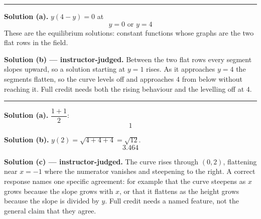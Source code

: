 \documentclass[12pt]{article}
\begin{document}
\vspace{0.15cm}\noindent\rule{\linewidth}{0.2pt}


\textbf{Solution (a).} $y(4-y) = 0$ at
\[ \boxed{y = 0 \text{ or } y = 4} \]
These are the equilibrium solutions: constant functions whose graphs are the two
flat rows in the field.

\textbf{Solution (b) --- instructor-judged.} Between the two flat rows every
segment slopes upward, so a solution starting at $y = 1$ rises. As it approaches
$y = 4$ the segments flatten, so the curve levels off and approaches $4$ from
below without reaching it. Full credit needs both the rising behaviour and the
levelling off at $4$.

\vspace{0.15cm}\noindent\rule{\linewidth}{0.2pt}


\textbf{Solution (a).} $\dfrac{1 + 1}{2}$:
\[ \boxed{1} \]

\textbf{Solution (b).} $y(2) = \sqrt{4 + 4 + 4} = \sqrt{12}$.
\[ \boxed{3.464} \]

\textbf{Solution (c) --- instructor-judged.} The curve rises through $(0,2)$,
flattening near $x = -1$ where the numerator vanishes and steepening to the
right. A correct response names one specific agreement: for example that the
curve steepens as $x$ grows because the slope grows with $x$, or that it flattens
as the height grows because the slope is divided by $y$. Full credit needs a
named feature, not the general claim that they agree.
\end{document}
